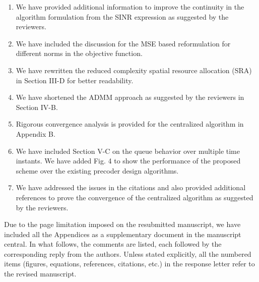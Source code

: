 \begin{enumerate}
\item We have provided additional information to improve the continuity in the algorithm formulation from the SINR expression as suggested by the reviewers.
\item We have included the discussion for the MSE based reformulation for different norms in the objective function.
\item We have rewritten the reduced complexity spatial resource allocation (SRA) in Section III-D for better readability.
\item We have shortened the ADMM approach as suggested by the reviewers in Section IV-B.
\item Rigorous convergence analysis is provided for the centralized algorithm in Appendix B.
\item We have included Section V-C on the queue behavior over multiple time instants. We have added Fig. 4 to show the performance of the proposed scheme over the existing precoder design algorithms.
\item We have addressed the issues in the citations and also provided additional references to prove the convergence of the centralized algorithm as suggested by the reviewers.
\end{enumerate}

Due to the page limitation imposed on the resubmitted manuscript, we have included all the Appendices as a supplementary document in the manuscript central. In what follows, the comments are listed, each followed by the corresponding reply from the authors. Unless stated explicitly, all the numbered items (figures, equations, references, citations, etc.) in the response letter refer to the revised manuscript.